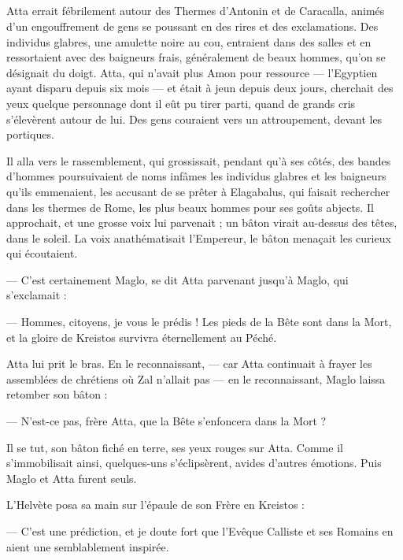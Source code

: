 \documentclass[a4paper, 11pt, oneside, polutonikogreek, french]{article}
\begin{document}
\subsection{}
\paragraph{}
Atta errait fébrilement autour des Thermes d'Antonin et de Caracalla, animés d'un engouffrement de gens se poussant en des rires et des exclamations. Des individus glabres, une amulette noire au cou, entraient dans des salles et en ressortaient avec des baigneurs frais, généralement de beaux hommes, qu'on se désignait du doigt. Atta, qui n'avait plus Amon pour ressource --- l'Egyptien ayant disparu depuis six mois --- et était à jeun depuis deux jours, cherchait des yeux quelque personnage dont il eût pu tirer parti, quand de grands cris s'élevèrent autour de lui. Des gens couraient vers un attroupement, devant les portiques.

Il alla vers le rassemblement, qui grossissait, pendant qu'à ses côtés, des bandes d'hommes poursuivaient de noms infâmes les individus glabres et les baigneurs qu'ils emmenaient, les accusant de se prêter à Elagabalus, qui faisait rechercher dans les thermes de Rome, les plus beaux hommes pour ses goûts abjects. Il approchait, et une grosse voix lui parvenait ; un bâton virait au-dessus des têtes, dans le soleil. La voix anathématisait l'Empereur, le bâton menaçait les curieux qui écoutaient.

--- C'est certainement Maglo, se dit Atta parvenant jusqu'à Maglo, qui s'exclamait :

--- Hommes, citoyens, je vous le prédis ! Les pieds de la Bête sont dans la Mort, et la gloire de Kreistos survivra éternellement au Péché.

Atta lui prit le bras. En le reconnaissant, --- car Atta continuait à frayer les assemblées de chrétiens où Zal n'allait pas --- en le reconnaissant, Maglo laissa retomber son bâton :

--- N'est-ce pas, frère Atta, que la Bête s'enfoncera dans la Mort ?

Il se tut, son bâton fiché en terre, ses yeux rouges sur Atta. Comme il s'immobilisait ainsi, quelques-uns s'éclipsèrent, avides d'autres émotions. Puis Maglo et Atta furent seuls.

L'Helvète posa sa main sur l'épaule de son Frère en Kreistos :

--- C'est une prédiction, et je doute fort que l'Evêque Calliste et ses Romains en aient une semblablement inspirée.
\end{document}
